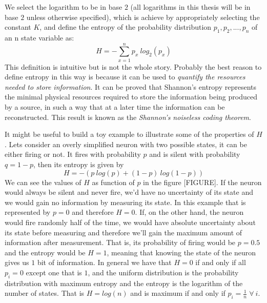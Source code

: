 We select the logarithm to be in base $2$ (all logarithms in this thesis will be in base $2$ unless otherwise specified), which is achieve by appropriately selecting the constant $K$, and define the entropy of the probability distribution $p_1,p_2,...,p_n$ of an n state variable as:
\begin{equation}
    H=- \sum_{x=1}^n p_x\ log_2 (p_x)
\end{equation}
This definition is intuitive but is not the whole story. Probably the best reason to define entropy in this way is because it can be used to \textit{quantify the resources needed to store information}. 
It can be proved that Shannon's entropy represents the minimal physical resources required to store the information being produced by a source, in such a way that at a later time the information can be reconstructed.
This result is known as the \textit{Shannon’s noiseless coding theorem}.

It might be useful to build a toy example to illustrate some of the properties of $H$. Lets consider an overly simplified neuron with two possible states, it can be either firing or not. It fires with probability $p$ and is silent with probability $q=1-p$, then its entropy is given by
\begin{equation}
    H=-(p\ log (p) + (1-p)\ log (1-p))
\end{equation}
We can see the values of $H$ as function of $p$ in the figure [FIGURE].
If the neuron would always be silent and never fire, we'd have no uncertainty of its state and we would gain no information by measuring its state.
In this example that is represented by $p=0$ and therefore $H=0$.
If, on the other hand, the neuron would fire randomly half of the time, we would have absolute uncertainty about its state before measuring and therefore we'll gain the maximum amount of information after measurement.
That is, its probability of firing would be $p=0.5$ and the entropy would be $H=1$, meaning that knowing the state of the neuron gives us $1$ bit of information.
In general we have that $H=0$ if and only if all $p_i=0$ except one that is $1$, and the uniform distribution is the probability distribution with maximum entropy and the entropy is the logarithm of the number of states.
That is $H=log(n)$ and is maximum if and only if $p_i=\frac{1}{n} \; \forall \ i$.

